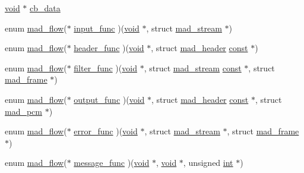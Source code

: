\begin{DoxyCompactItemize}
\begin{tabbing}
\end{tabbing}\item 
\hyperlink{sound_8c_ae35f5844602719cf66324f4de2a658b3}{void} $\ast$ \hyperlink{structmad__decoder_a7394a68adf1e161ea618ca1e7295bd5e}{cb\+\_\+data}
\item 
enum \hyperlink{libmad_2decoder_8h_a665565932de11bfcb75513a8e61543c3}{mad\+\_\+flow}($\ast$ \hyperlink{structmad__decoder_a006915bc94cbb087f5a2073a4b49d1bd}{input\+\_\+func} )(\hyperlink{sound_8c_ae35f5844602719cf66324f4de2a658b3}{void} $\ast$, struct \hyperlink{structmad__stream}{mad\+\_\+stream} $\ast$)
\item 
enum \hyperlink{libmad_2decoder_8h_a665565932de11bfcb75513a8e61543c3}{mad\+\_\+flow}($\ast$ \hyperlink{structmad__decoder_ade30180873067a42e095265390dc1ba4}{header\+\_\+func} )(\hyperlink{sound_8c_ae35f5844602719cf66324f4de2a658b3}{void} $\ast$, struct \hyperlink{structmad__header}{mad\+\_\+header} \hyperlink{getopt1_8c_a2c212835823e3c54a8ab6d95c652660e}{const} $\ast$)
\item 
enum \hyperlink{libmad_2decoder_8h_a665565932de11bfcb75513a8e61543c3}{mad\+\_\+flow}($\ast$ \hyperlink{structmad__decoder_ab2c40d16b6339ff1ad4c4142069c3597}{filter\+\_\+func} )(\hyperlink{sound_8c_ae35f5844602719cf66324f4de2a658b3}{void} $\ast$, struct \hyperlink{structmad__stream}{mad\+\_\+stream} \hyperlink{getopt1_8c_a2c212835823e3c54a8ab6d95c652660e}{const} $\ast$, struct \hyperlink{structmad__frame}{mad\+\_\+frame} $\ast$)
\item 
enum \hyperlink{libmad_2decoder_8h_a665565932de11bfcb75513a8e61543c3}{mad\+\_\+flow}($\ast$ \hyperlink{structmad__decoder_a48289cb5be13e08b11f880a87d3990ef}{output\+\_\+func} )(\hyperlink{sound_8c_ae35f5844602719cf66324f4de2a658b3}{void} $\ast$, struct \hyperlink{structmad__header}{mad\+\_\+header} \hyperlink{getopt1_8c_a2c212835823e3c54a8ab6d95c652660e}{const} $\ast$, struct \hyperlink{structmad__pcm}{mad\+\_\+pcm} $\ast$)
\item 
enum \hyperlink{libmad_2decoder_8h_a665565932de11bfcb75513a8e61543c3}{mad\+\_\+flow}($\ast$ \hyperlink{structmad__decoder_aad0550e4516e52a1b59a5d2d95ebe3d9}{error\+\_\+func} )(\hyperlink{sound_8c_ae35f5844602719cf66324f4de2a658b3}{void} $\ast$, struct \hyperlink{structmad__stream}{mad\+\_\+stream} $\ast$, struct \hyperlink{structmad__frame}{mad\+\_\+frame} $\ast$)
\item 
enum \hyperlink{libmad_2decoder_8h_a665565932de11bfcb75513a8e61543c3}{mad\+\_\+flow}($\ast$ \hyperlink{structmad__decoder_a44577c1d539888c49dcc2f06dc136076}{message\+\_\+func} )(\hyperlink{sound_8c_ae35f5844602719cf66324f4de2a658b3}{void} $\ast$, \hyperlink{sound_8c_ae35f5844602719cf66324f4de2a658b3}{void} $\ast$, unsigned \hyperlink{xmltok_8h_a5a0d4a5641ce434f1d23533f2b2e6653}{int} $\ast$)

\end{DoxyCompactItemize}
